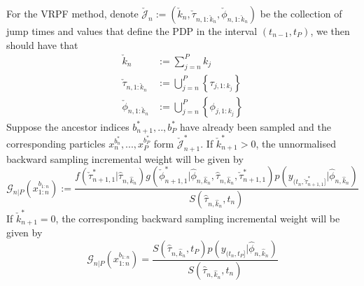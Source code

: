 \documentclass[12pt,a4paper]{article}
\begin{document}
For the VRPF method, denote \(\check{\mathcal{J}}_{n}:=(\check{k}_n,\check{\tau}_{n,1:\check{k}_n},\check{\phi}_{n,1:\check{k}_n})\) be the collection of jump times and values that define the PDP in the interval \((t_{n-1},t_P)\), we then should have that 
\begin{align*}
    \check{k}_n &:= \sum_{j=n}^{P} k_j \\
    \check{\tau}_{n,1:\check{k}_n} &:=  \bigcup_{j=n}^{P} \left\{\tau_{j,1:k_j}\right\}\\
    \check{\phi}_{n,1:\check{k}_n} &:=  \bigcup_{j=n}^{P} \left\{\phi_{j,1:k_j}\right\}
\end{align*}
Suppose the ancestor indices $b_{n+1}^{*},..,b_P^{*}$ have already been sampled and the corresponding particles \(x_{n}^{b_n^*},...,x_P^{b_P^*}\) form $\check{\mathcal{J}}_{n+1}^{*}$. If $\check{k}_{n+1}^{*}>0$, the unnormalised backward sampling incremental weight will be given by 
\begin{equation}
    \label{PMCMC - VRPF Backward Simulation Weight 1}
    \mathcal{G}_{n|P}(x_{1:n}^{b_{1:n}}) := \frac{f(\check{\tau}_{n+1,1}^{*}|\hat{\tau}_{n,\hat{k}_n})g(\check{\phi}_{n+1,1}^{*}|\hat{\phi}_{n,\hat{k}_n},\hat{\tau}_{n,\hat{k}_n},\check{\tau}_{n+1,1}^{*})p(y_{(t_n,\check{\tau}_{n+1,1}^{*}]}|\hat{\phi}_{n,\hat{k}_n})}{S(\hat{\tau}_{n,\hat{k}_n},t_n)}
\end{equation}
If $\check{k}_{n+1}^{*} = 0$, the corresponding backward sampling incremental weight will be given by 
\begin{equation}
    \label{PMCMC - VRPF Backward Simulation Weight 2}
    \mathcal{G}_{n|P}(x_{1:n}^{b_{1:n}}) = \frac{S(\hat{\tau}_{n,\hat{k}_n},t_P)p(y_{(t_n,t_P]}|\hat{\phi}_{n,\hat{k}_n})}{S(\hat{\tau}_{n,\hat{k}_n},t_n)}
\end{equation}
\end{document}
